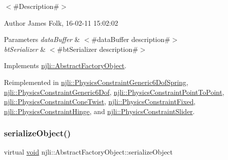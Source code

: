 $<$\#\+Description\#$>$ 

\begin{DoxyAuthor}{Author}
James Folk, 16-\/02-\/11 15\+:02\+:02
\end{DoxyAuthor}

\begin{DoxyParams}{Parameters}
{\em data\+Buffer} & $<$\#data\+Buffer description\#$>$ \\
\hline
{\em bt\+Serializer} & $<$\#bt\+Serializer description\#$>$ \\
\hline
\end{DoxyParams}


Implements \mbox{\hyperlink{classnjli_1_1_abstract_factory_object_aad2fbe86fb3bdecf02918a96b9c57976}{njli\+::\+Abstract\+Factory\+Object}}.



Reimplemented in \mbox{\hyperlink{classnjli_1_1_physics_constraint_generic6_dof_spring_a8d00ec82407e32449b1e9016c13ca301}{njli\+::\+Physics\+Constraint\+Generic6\+Dof\+Spring}}, \mbox{\hyperlink{classnjli_1_1_physics_constraint_generic6_dof_adebf86567407706023e5800b59308635}{njli\+::\+Physics\+Constraint\+Generic6\+Dof}}, \mbox{\hyperlink{classnjli_1_1_physics_constraint_point_to_point_a9327a02aa2883e39074baf3503c2ddcc}{njli\+::\+Physics\+Constraint\+Point\+To\+Point}}, \mbox{\hyperlink{classnjli_1_1_physics_constraint_cone_twist_a0525276852c678e2dcda35d864d035db}{njli\+::\+Physics\+Constraint\+Cone\+Twist}}, \mbox{\hyperlink{classnjli_1_1_physics_constraint_fixed_a36b23b6b62b01e82724b71bc02e5c887}{njli\+::\+Physics\+Constraint\+Fixed}}, \mbox{\hyperlink{classnjli_1_1_physics_constraint_hinge_ab3af6e3d64bf17cdf5cef687df03cdda}{njli\+::\+Physics\+Constraint\+Hinge}}, and \mbox{\hyperlink{classnjli_1_1_physics_constraint_slider_ab29e0ae4cc45af8ac95cfe8052f1ed48}{njli\+::\+Physics\+Constraint\+Slider}}.

\mbox{\label{classnjli_1_1_physics_constraint_a4fc4bcd9d1930911474210c047372fc0}} 
\subsubsection{\texorpdfstring{serialize\+Object()}{serializeObject()}}
{\footnotesize\ttfamily virtual \mbox{\hyperlink{_thread_8h_af1e856da2e658414cb2456cb6f7ebc66}{void}} njli\+::\+Abstract\+Factory\+Object\+::serialize\+Object}

